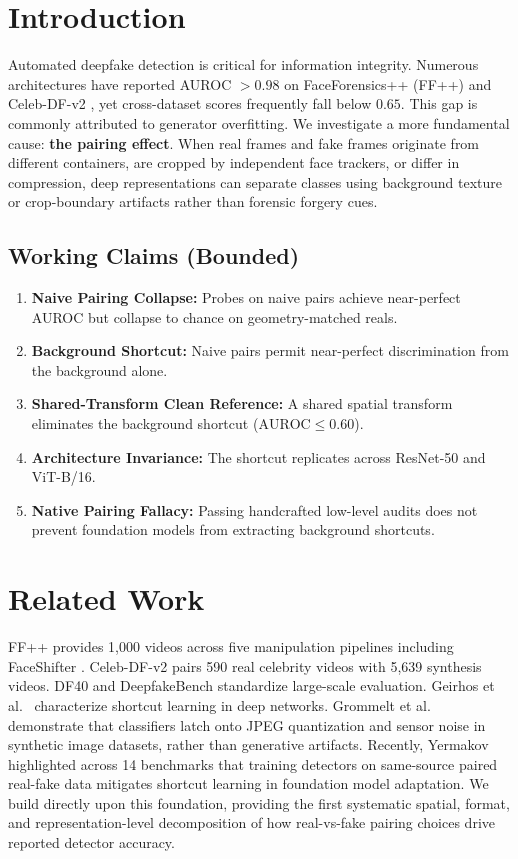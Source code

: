 \documentclass[10pt,twocolumn]{article}
\begin{document}
\section{Introduction}

Automated deepfake detection is critical for information integrity.
Numerous architectures have reported AUROC $> 0.98$ on FaceForensics++ (FF++) \cite{rossler2019ff} and Celeb-DF-v2 \cite{li2020c}, yet cross-dataset scores frequently fall below $0.65$.
This gap is commonly attributed to generator overfitting.
We investigate a more fundamental cause: \textbf{the pairing effect}.
When real frames and fake frames originate from different containers, are cropped by independent face trackers, or differ in compression, deep representations can separate classes using background texture or crop-boundary artifacts rather than forensic forgery cues.

\subsection{Working Claims (Bounded)}
\begin{enumerate}[leftmargin=*,label=\arabic*.]
\item \textbf{Naive Pairing Collapse:} Probes on naive pairs achieve near-perfect AUROC but collapse to chance on geometry-matched reals.
\item \textbf{Background Shortcut:} Naive pairs permit near-perfect discrimination from the background alone.
\item \textbf{Shared-Transform Clean Reference:} A shared spatial transform eliminates the background shortcut ($\mathrm{AUROC} \leq 0.60$).
\item \textbf{Architecture Invariance:} The shortcut replicates across ResNet-50 and ViT-B/16.
\item \textbf{Native Pairing Fallacy:} Passing handcrafted low-level audits does not prevent foundation models from extracting background shortcuts.
\end{enumerate}

\section{Related Work}

FF++ \cite{rossler2019ff} provides 1,000 videos across five manipulation pipelines including FaceShifter \cite{li2020a}.
Celeb-DF-v2 \cite{li2020c} pairs 590 real celebrity videos with 5,639 synthesis videos.
DF40 \cite{yan2024df40} and DeepfakeBench \cite{yan2023bench} standardize large-scale evaluation.
Geirhos et al.\ \cite{geirhos2020shortcut} characterize shortcut learning in deep networks.
Grommelt et al.\ \cite{grommelt2024jpeg} demonstrate that classifiers latch onto JPEG quantization and sensor noise in synthetic image datasets, rather than generative artifacts.
Recently, Yermakov \cite{yermakov2026gend} highlighted across 14 benchmarks that training detectors on same-source paired real-fake data mitigates shortcut learning in foundation model adaptation.
We build directly upon this foundation, providing the first systematic spatial, format, and representation-level decomposition of how real-vs-fake pairing choices drive reported detector accuracy.
\end{document}
